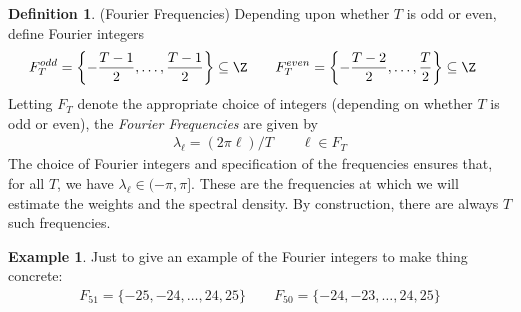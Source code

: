 \documentclass[12pt]{article}
\theoremstyle{plain}
\theoremstyle{definition}
\newtheorem{defn}[thm]{Definition}
\newtheorem{ex}[thm]{Example}
\theoremstyle{remark}
\begin{document}
\begin{defn}(Fourier Frequencies)
Depending upon whether $T$ is odd or even, define Fourier integers
\begin{align*}
  F_T^{odd}
  &= \left\{-\frac{T-1}{2},\ldots,\frac{T-1}{2}\right\}
  \subseteq\Z
  \qquad
  F_T^{even}
  = \left\{-\frac{T-2}{2},\ldots,\frac{T}{2}\right\}
  \subseteq\Z
\end{align*}
Letting $F_T$ denote the appropriate choice of integers (depending on
whether $T$ is odd or even), the \emph{Fourier Frequencies} are given by
\begin{align*}
  \lambda_\ell = (2\pi\ell)/T
  \qquad \ell \in F_T
\end{align*}
The choice of Fourier integers and specification of the frequencies
ensures that, for all $T$, we have $\lambda_\ell\in(-\pi,\pi]$.
These are the frequencies at which we will estimate the weights and the
spectral density.
By construction, there are always $T$ such frequencies.
\end{defn}

\begin{ex}
Just to give an example of the Fourier integers to make thing concrete:
\begin{align*}
  F_{51} = \{-25,-24,\ldots,24,25\}
  \qquad
  F_{50} = \{-24,-23,\ldots,24,25\}
\end{align*}
\end{ex}
\end{document}
